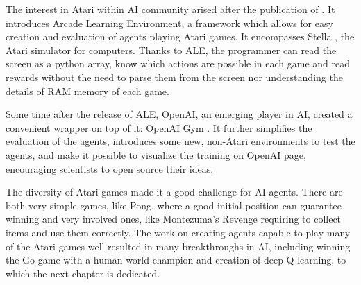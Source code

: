 The interest in Atari within AI community arised after the publication of \cite{ale}. It introduces Arcade Learning Environment, a framework which allows for easy creation and evaluation of agents playing Atari games. It encompasses Stella \cite{stella}, the Atari simulator for computers. Thanks to ALE, the programmer can read the screen as a python array, know which actions are possible in each game and read rewards without the need to parse them from the screen nor understanding the details of RAM memory of each game.

Some time after the release of ALE, OpenAI, an emerging player in AI, created a convenient wrapper on top of it: OpenAI Gym \cite{gym}. It further simplifies the evaluation of the agents, introduces some new, non-Atari environments to test the agents, and make it possible to visualize the training on OpenAI page, encouraging scientists to open source their ideas.

The diversity of Atari games made it a good challenge for AI agents. There are both very simple games, like Pong, where a good initial position can guarantee winning and very involved ones, like Montezuma's Revenge  requiring to collect items and use them correctly. The work on creating agents capable to play many of the Atari games well resulted in many breakthroughs in AI, including winning the Go game with a human world-champion \cite{alphago} and creation of deep Q-learning, to which the next chapter is dedicated.
